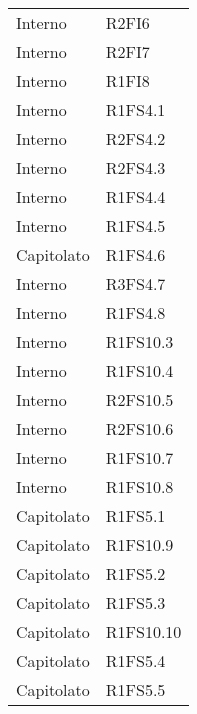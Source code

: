 {\begin{longtable}{ C{4cm} C{4cm}}
Interno & R2FI6\\

Interno & R2FI7\\


Interno & R1FI8\\

Interno & R1FS4.1\\

Interno & R2FS4.2\\

Interno & R2FS4.3\\

Interno & R1FS4.4\\

Interno & R1FS4.5\\

Capitolato & R1FS4.6\\

Interno & R3FS4.7\\

Interno & R1FS4.8\\


Interno & R1FS10.3\\

Interno & R1FS10.4\\

Interno & R2FS10.5\\

Interno & R2FS10.6\\

Interno & R1FS10.7\\

Interno & R1FS10.8\\


Capitolato & R1FS5.1\\

Capitolato & R1FS10.9\\

Capitolato & R1FS5.2\\

Capitolato & R1FS5.3\\

Capitolato & R1FS10.10\\

Capitolato & R1FS5.4\\

Capitolato & R1FS5.5\\


\end{longtable}}
